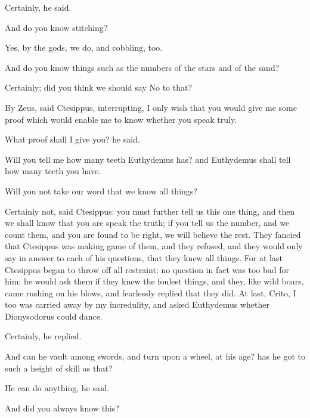 \documentclass[11pt,letter]{article}
\begin{document}
\par  Certainly, he said.

\par  And do you know stitching?

\par  Yes, by the gods, we do, and cobbling, too.

\par  And do you know things such as the numbers of the stars and of the sand?

\par  Certainly; did you think we should say No to that?

\par  By Zeus, said Ctesippus, interrupting, I only wish that you would give me some proof which would enable me to know whether you speak truly.

\par  What proof shall I give you? he said.

\par  Will you tell me how many teeth Euthydemus has? and Euthydemus shall tell how many teeth you have.

\par  Will you not take our word that we know all things?

\par  Certainly not, said Ctesippus: you must further tell us this one thing, and then we shall know that you are speak the truth; if you tell us the number, and we count them, and you are found to be right, we will believe the rest. They fancied that Ctesippus was making game of them, and they refused, and they would only say in answer to each of his questions, that they knew all things. For at last Ctesippus began to throw off all restraint; no question in fact was too bad for him; he would ask them if they knew the foulest things, and they, like wild boars, came rushing on his blows, and fearlessly replied that they did. At last, Crito, I too was carried away by my incredulity, and asked Euthydemus whether Dionysodorus could dance.

\par  Certainly, he replied.

\par  And can he vault among swords, and turn upon a wheel, at his age? has he got to such a height of skill as that?

\par  He can do anything, he said.

\par  And did you always know this?
\end{document}
